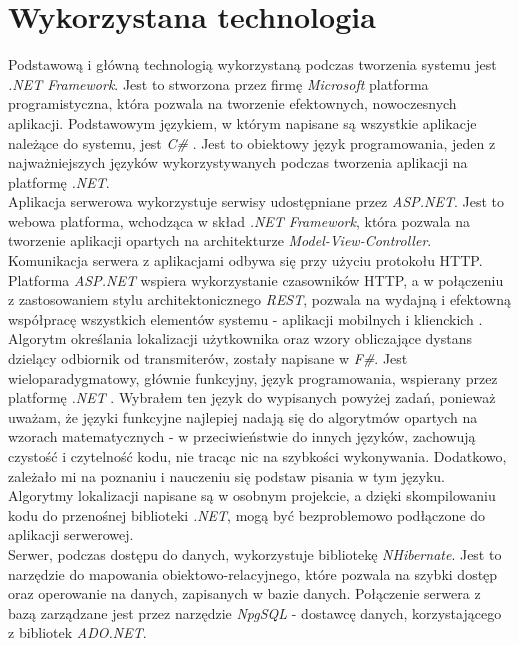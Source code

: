 \section{Wykorzystana technologia}
Podstawową i główną technologią wykorzystaną podczas tworzenia systemu jest \textit{.NET Framework}. Jest to stworzona przez firmę \textit{Microsoft} platforma programistyczna, która pozwala na tworzenie efektownych, nowoczesnych aplikacji. Podstawowym językiem, w którym napisane są wszystkie aplikacje należące do systemu, jest \textit{C\#} \cite{NET}. Jest to obiektowy język programowania, jeden z najważniejszych języków wykorzystywanych podczas tworzenia aplikacji na platformę \textit{.NET}.\\
Aplikacja serwerowa wykorzystuje serwisy udostępniane przez \textit{ASP.NET}. Jest to webowa platforma, wchodząca w skład \textit{.NET Framework}, która pozwala na tworzenie aplikacji opartych na architekturze \textit{Model-View-Controller}. Komunikacja serwera z aplikacjami odbywa się przy użyciu protokołu HTTP. Platforma \textit{ASP.NET} wspiera wykorzystanie czasowników HTTP, a w połączeniu z zastosowaniem stylu architektonicznego \textit{REST}, pozwala na wydajną i efektowną współpracę wszystkich elementów systemu - aplikacji mobilnych i klienckich \cite{ASP}.\\
Algorytm określania lokalizacji użytkownika oraz wzory obliczające dystans dzielący odbiornik od transmiterów, zostały napisane w \textit{F\#}. Jest wieloparadygmatowy, głównie funkcyjny, język programowania, wspierany przez platformę \textit{.NET} \cite{FS}. Wybrałem ten język do wypisanych powyżej zadań, ponieważ uważam, że języki funkcyjne najlepiej nadają się do algorytmów opartych na wzorach matematycznych - w przeciwieństwie do innych języków, zachowują czystość i czytelność kodu, nie tracąc nic na szybkości wykonywania. Dodatkowo, zależało mi na poznaniu i nauczeniu się podstaw pisania w tym języku. Algorytmy lokalizacji napisane są w osobnym projekcie, a dzięki skompilowaniu kodu do przenośnej biblioteki \textit{.NET}, mogą być bezproblemowo podłączone do aplikacji serwerowej.\\
Serwer, podczas dostępu do danych, wykorzystuje bibliotekę \textit{NHibernate}. Jest to narzędzie do mapowania obiektowo-relacyjnego, które pozwala na szybki dostęp oraz operowanie na danych, zapisanych w bazie danych. Połączenie serwera z bazą zarządzane jest przez narzędzie \textit{NpgSQL} - dostawcę danych, korzystającego z bibliotek \textit{ADO.NET}.\\
